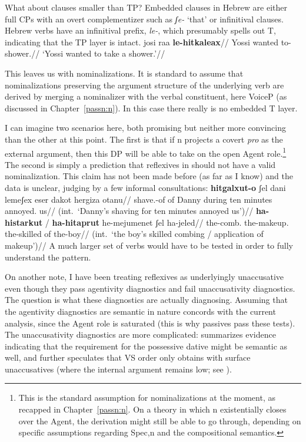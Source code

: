 What about clauses smaller than TP? Embedded clauses in Hebrew are either full CPs with an overt complementizer such as \emph{ʃe-} `that' or infinitival clauses. Hebrew verbs have an infinitival prefix, \emph{le-}, which presumably spells out T, indicating that the TP layer is intact.
\ex
	\begingl
	\gla josi ra{\ts}a \textbf{le-hitkaleax}//
	\glb Yossi wanted to-shower.//
	\glft `Yossi wanted to take a shower.'//
	\endgl
\xe

This leaves us with nominalizations. It is standard to assume that nominalizations preserving the argument structure of the underlying verb are derived by merging a nominalizer with the verbal constituent, here VoiceP (as discussed in Chapter~\ref{passn:n}). In this case there really is no embedded T layer.

I can imagine two scenarios here, both promising but neither more convincing than the other at this point. The first is that if n projects a covert \emph{pro} as the external argument, then this DP will be able to take on the open Agent role.\footnote{This is the standard assumption for nominalizations at the moment, as recapped in Chapter~\ref{passn:n}. On a theory in which n existentially closes over the Agent, the derivation might still be able to go through, depending on specific assumptions regarding Spec,n and the compositional semantics.} The second is simply a prediction that reflexives in {\thit} should not have a valid nominalization. This claim has not been made before (as far as I know) and the data is unclear, judging by a few informal consultations:
\pex
	\a \ljudge{\%} \begingl
		\gla \textbf{hitgalxut-o} ʃel dani lemeʃex eser dakot hergiza otanu//
		\glb shave.-of of Danny during ten minutes annoyed. us//
		\glft (int.~`Danny's shaving for ten minutes annoyed us')//
	\endgl
	\a \ljudge{\%} \begingl
		\gla \textbf{ha-histarkut} / \textbf{ha-hitaprut} he-mejumenet ʃel ha-jeled//
		\glb the-comb. {} the-makeup. the-skilled of the-boy//
		\glft (int.~`the boy's skilled combing / application of makeup')//
	\endgl
\xe 
A much larger set of verbs would have to be tested in order to fully understand the pattern.

On another note, I have been treating reflexives as underlyingly unaccusative even though they pass agentivity diagnostics and fail unaccusativity diagnostics. The question is what these diagnostics are actually diagnosing. Assuming that the agentivity diagnostics are semantic in nature concords with the current analysis, since the Agent role is saturated (this is why passives pass these tests). The unaccusativity diagnostics are more complicated: \cite{kastner17gjgl} summarizes evidence indicating that the requirement for the possessive dative might be semantic as well, and further speculates that VS order only obtains with surface unaccusatives (where the internal argument remains low; see \citealt{unaccusativity95}).

